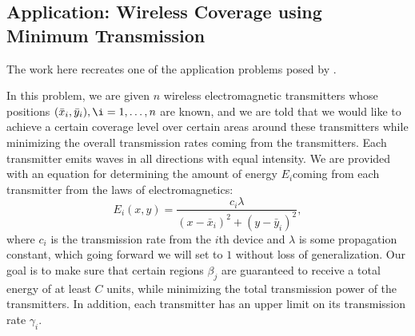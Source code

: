 	\subsection{Application: Wireless Coverage using Minimum Transmission}
	
	The work here recreates one of the application problems posed by \cite{Ahmadi2016a}.
	
	In this problem, we are given $n$ wireless electromagnetic transmitters whose positions $(\bar{x}_i , \bar{y}_i), \i = 1, \dots, n$ are known, and we are told that we would like to achieve a certain coverage level over certain areas around these transmitters while minimizing the overall transmission rates coming from the transmitters. Each transmitter emits waves in all directions with equal intensity. We are provided with an equation for determining the amount of energy $E_i$coming from each transmitter from the laws of electromagnetics:
	$$
	E_i (x,y) = \frac{c_i \lambda}{(x - \bar{x}_i)^2 + (y - \bar{y}_i)^2},
	$$
	where $c_i$ is the transmission rate from the $i$th device and $\lambda$ is some propagation constant, which going forward we will set to $1$ without loss of generalization. Our goal is to make sure that certain regions $\beta_j$ are guaranteed to receive a total energy of at least $C$ units, while minimizing the total transmission power of the transmitters. In addition, each transmitter has an upper limit on its transmission rate $\gamma_i$.
	
